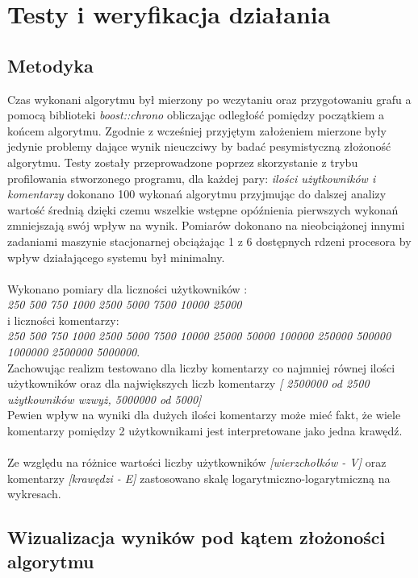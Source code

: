 \documentclass[11pt]{article}
\newcommand{\+}{\discretionary{\mbox{\scriptsize$\hookleftarrow$}}{}{}}
\begin{document}
\section{Testy i weryfikacja działania}
\subsection{Metodyka}
Czas wykonani algorytmu był mierzony po wczytaniu oraz przygotowaniu grafu a pomocą biblioteki \textsl{boost::chrono} obliczając odległość pomiędzy początkiem a końcem algorytmu. Zgodnie z wcześniej przyjętym założeniem mierzone były jedynie problemy dające wynik nieuczciwy by badać pesymistyczną złożoność algorytmu. Testy zostały przeprowadzone poprzez skorzystanie z trybu profilowania stworzonego programu, dla każdej pary: \textsl{ilości użytkowników i komentarzy} dokonano 100 wykonań algorytmu przyjmując do dalszej analizy wartość średnią dzięki czemu wszelkie wstępne opóźnienia pierwszych wykonań zmniejszają swój wpływ na wynik. Pomiarów dokonano na nieobciążonej innymi zadaniami maszynie stacjonarnej obciążając 1 z 6 dostępnych rdzeni procesora by wpływ działającego systemu był minimalny.\\ \\
Wykonano pomiary dla liczności użytkowników : \\
\textit{250 500 750 1000 2500 5000 7500 10000 25000} \\
i liczności komentarzy:\\
\textit{250 500 750 1000 2500 5000 7500 10000 25000 50000 100000 250000 500000 1000000 2500000 5000000}.\\
Zachowując realizm testowano dla liczby komentarzy co najmniej równej ilości użytkowników oraz dla największych liczb komentarzy \textit{[ 2500000 od 2500 użytkowników wzwyż, 5000000 od 5000]}\\
Pewien wpływ na wyniki dla dużych ilości komentarzy może mieć fakt, że wiele komentarzy pomiędzy 2 użytkownikami jest interpretowane jako jedna krawędź.\\\\
Ze względu na różnice wartości liczby użytkowników \textit{[wierzchołków - V]} oraz komentarzy \textit{[krawędzi - E]} zastosowano skalę logarytmiczno-logarytmiczną na wykresach.
\subsection{Wizualizacja wyników pod kątem złożoności algorytmu}
\end{document}
